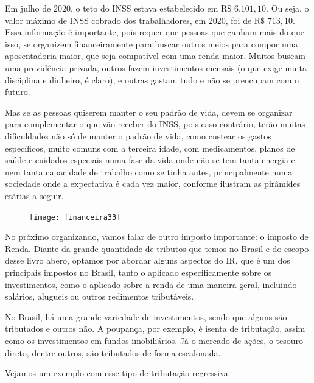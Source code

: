 Em julho de 2020, o teto do INSS estava estabelecido em R\$ $6.101{,}10$. Ou seja, o valor máximo de INSS cobrado dos trabalhadores, em 2020, foi de R\$ $713{,}10$. Essa informação é importante, pois requer que pessoas que ganham mais do que isso, se organizem financeiramente para buscar outros meios para compor uma aposentadoria maior, que seja compatível com uma renda maior. Muitos buscam uma previdência privada, outros fazem investimentos mensais (o que exige muita disciplina e dinheiro, é claro), e outras gastam tudo e não se preocupam com o futuro.

Mas se as pessoas quiserem manter o seu padrão de vida, devem se organizar para complementar o que vão receber do INSS, pois caso contrário, terão muitas dificuldades não só de manter o padrão de vida, como custear os gastos específicos, muito comuns com a terceira idade, com medicamentos, planos de saúde e cuidados especiais numa fase da vida onde não se tem tanta energia e nem tanta capacidade de trabalho como se tinha antes, principalmente numa sociedade onde a expectativa é cada vez maior, conforme ilustram as pirâmides etárias a seguir.

\begin{figure}[H]
\centering

\texttt{[image: financeira33]}
\end{figure}

No próximo organizando, vamos falar de outro imposto importante: o imposto de Renda. Diante da grande quantidade de tributos que temos no Brasil e do escopo desse livro abero, optamos por abordar alguns aspectos do IR, que é um dos principais impostos no Brasil, tanto o aplicado especificamente sobre os investimentos, como o aplicado sobre a renda de uma maneira geral, incluindo salários, alugueis ou outros redimentos tributáveis.


No Brasil, há uma grande variedade de investimentos, sendo que alguns são tributados e outros não. A poupança, por exemplo, é isenta de tributação, assim como os investimentos em fundos imobiliários. Já o mercado de ações, o tesouro direto, dentre outros, são tributados de forma escalonada.

Vejamos um exemplo com esse tipo de tributação regressiva.

